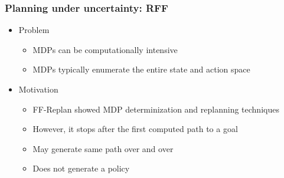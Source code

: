 \documentclass{beamer}
\let\origframetitle=\frametitle
\renewcommand\frametitle[1]{\origframetitle{\textbf{\large{\textrm{#1}}}}}
\begin{document}
\begin{frame}
  \frametitle{Planning under uncertainty: RFF}

  \begin{itemize}
    \item Problem
      \begin{itemize}
        \item MDPs can be computationally intensive
        \item MDPs typically enumerate the entire state and action space
      \end{itemize}
    \item Motivation
      \begin{itemize}
        \item FF-Replan showed MDP determinization and replanning techniques
        \item However, it stops after the first computed path to a goal
        \item May generate same path over and over
        \item Does not generate a policy
      \end{itemize}
  \end{itemize}

\end{frame}
\end{document}
